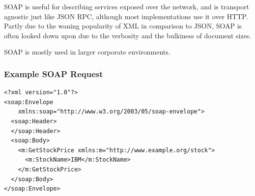 \documentclass{book}
\begin{document}
SOAP is useful for describing services exposed over the network, and is transport agnostic just like JSON RPC, although most implementations use it over HTTP. Partly due to the waning popularity of XML in comparison to JSON, SOAP is often looked down upon due to the verbosity and the bulkiness of document sizes.

SOAP is mostly used in larger corporate environments.

\subsubsection{Example SOAP Request}

\begin{verbatim}
<?xml version="1.0"?>
<soap:Envelope
    xmlns:soap="http://www.w3.org/2003/05/soap-envelope">
  <soap:Header>
  </soap:Header>
  <soap:Body>
    <m:GetStockPrice xmlns:m="http://www.example.org/stock">
      <m:StockName>IBM</m:StockName>
    </m:GetStockPrice>
  </soap:Body>
</soap:Envelope>
\end{verbatim}



\end{document}
